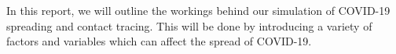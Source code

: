 
In this report, we will outline the workings behind our simulation of COVID-19 spreading and contact tracing. This will be done by introducing a variety of factors and variables which can affect the spread of COVID-19.